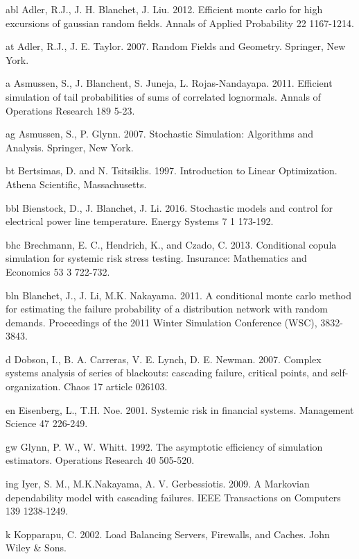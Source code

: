 \documentclass[final,11pt,3p]{article}\usepackage{setspace}
\begin{document}
\begin{thebibliography}{}

\bibitem 
{abl}
Adler, R.J., J. H. Blanchet, J. Liu. 2012. Efficient monte carlo for high excursions of gaussian random fields. Annals of Applied Probability 22 1167-1214.

\bibitem 
{at}
Adler, R.J., J. E. Taylor. 2007. Random Fields and Geometry. Springer, New York.

\bibitem 
{a}
Asmussen, S., J. Blanchent, S. Juneja, L. Rojas-Nandayapa. 2011. Efficient simulation of tail probabilities of sums of correlated lognormals. Annals of Operations Research 189 5-23.

\bibitem 
{ag}
Asmussen, S., P. Glynn. 2007. Stochastic Simulation: Algorithms and Analysis. Springer, New York.

\bibitem 
{bt}
Bertsimas, D. and N. Tsitsiklis. 1997. Introduction to Linear Optimization. Athena Scientific, Massachusetts.

\bibitem 
{bbl}
Bienstock, D., J. Blanchet, J. Li. 2016. Stochastic models and control for electrical power line temperature. Energy Systems 7 1 173-192.

\bibitem 
{bhc}
Brechmann, E. C., Hendrich, K., and Czado, C. 2013. Conditional copula simulation for systemic risk stress testing. Insurance: Mathematics and Economics 53 3 722-732.

\bibitem 
{bln}
Blanchet, J., J. Li, M.K. Nakayama. 2011. A conditional monte carlo method for estimating the failure probability of a distribution network with random demands. Proceedings of the 2011 Winter Simulation Conference (WSC),  3832-3843.

\bibitem 
{d}
Dobson, I., B. A. Carreras, V. E. Lynch, D. E. Newman. 2007. Complex systems analysis of series of blackouts: cascading failure, critical points, and self-organization. Chaos 17 article 026103.

\bibitem 
{en}
Eisenberg, L., T.H. Noe. 2001. Systemic risk in financial systems. Management Science 47 226-249.

\bibitem 
{gw}
Glynn, P. W., W. Whitt. 1992. The asymptotic efficiency of simulation estimators. Operations Research 40 505-520.

\bibitem 
{ing}
Iyer, S. M., M.K.Nakayama, A. V. Gerbessiotis. 2009. A Markovian dependability model with cascading failures. IEEE Transactions on Computers 139 1238-1249.

\bibitem 
{k}
Kopparapu, C. 2002. Load Balancing Servers, Firewalls, and Caches. John Wiley \& Sons.


\end{thebibliography}
\end{document}
